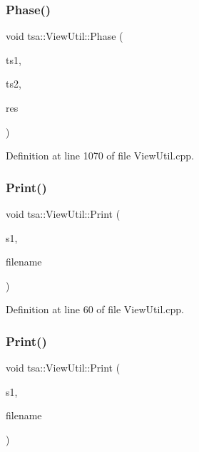 \subsubsection{\texorpdfstring{Phase()}{Phase()}}
{\footnotesize\ttfamily void tsa\+::\+View\+Util\+::\+Phase (\begin{DoxyParamCaption}\item[{\hyperlink{namespacetsa_ab32775c889b53c40fa83939f22372b75}{Seq\+View\+Complex} \&}]{ts1,  }\item[{\hyperlink{namespacetsa_ab32775c889b53c40fa83939f22372b75}{Seq\+View\+Complex} \&}]{ts2,  }\item[{\hyperlink{namespacetsa_ab32775c889b53c40fa83939f22372b75}{Seq\+View\+Complex} \&}]{res }\end{DoxyParamCaption})\hspace{0.3cm}{\ttfamily [static]}}



Definition at line 1070 of file View\+Util.\+cpp.

\mbox{\label{classtsa_1_1_view_util_a164858cf99bb21da58de6f7c34400a09}} 
\subsubsection{\texorpdfstring{Print()}{Print()}\hspace{0.1cm}{\footnotesize\ttfamily [1/3]}}
{\footnotesize\ttfamily void tsa\+::\+View\+Util\+::\+Print (\begin{DoxyParamCaption}\item[{\hyperlink{namespacetsa_ac599574bcc094eda25613724b8f3ca9e}{Seq\+View\+Double} \&}]{s1,  }\item[{char $\ast$}]{filename }\end{DoxyParamCaption})\hspace{0.3cm}{\ttfamily [static]}}



Definition at line 60 of file View\+Util.\+cpp.

\mbox{\label{classtsa_1_1_view_util_a9669abbb59a08c0b36cdee2b478f5c95}} 
\subsubsection{\texorpdfstring{Print()}{Print()}\hspace{0.1cm}{\footnotesize\ttfamily [2/3]}}
{\footnotesize\ttfamily void tsa\+::\+View\+Util\+::\+Print (\begin{DoxyParamCaption}\item[{\hyperlink{namespacetsa_ab32775c889b53c40fa83939f22372b75}{Seq\+View\+Complex} \&}]{s1,  }\item[{char $\ast$}]{filename }\end{DoxyParamCaption})\hspace{0.3cm}{\ttfamily [static]}}



